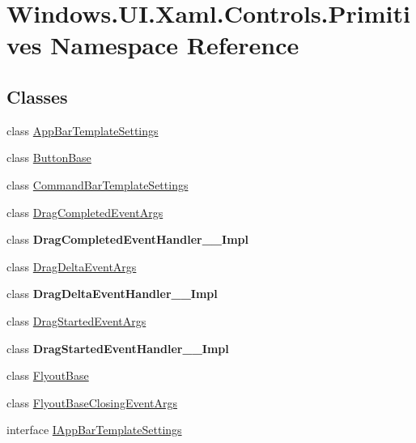 \hypertarget{namespace_windows_1_1_u_i_1_1_xaml_1_1_controls_1_1_primitives}{}\section{Windows.\+U\+I.\+Xaml.\+Controls.\+Primitives Namespace Reference}
\label{namespace_windows_1_1_u_i_1_1_xaml_1_1_controls_1_1_primitives}
\subsection*{Classes}
\begin{DoxyCompactItemize}
\item 
class \hyperlink{class_windows_1_1_u_i_1_1_xaml_1_1_controls_1_1_primitives_1_1_app_bar_template_settings}{App\+Bar\+Template\+Settings}
\item 
class \hyperlink{class_windows_1_1_u_i_1_1_xaml_1_1_controls_1_1_primitives_1_1_button_base}{Button\+Base}
\item 
class \hyperlink{class_windows_1_1_u_i_1_1_xaml_1_1_controls_1_1_primitives_1_1_command_bar_template_settings}{Command\+Bar\+Template\+Settings}
\item 
class \hyperlink{class_windows_1_1_u_i_1_1_xaml_1_1_controls_1_1_primitives_1_1_drag_completed_event_args}{Drag\+Completed\+Event\+Args}
\item 
class {\bfseries Drag\+Completed\+Event\+Handler\+\_\+\+\_\+\+Impl}
\item 
class \hyperlink{class_windows_1_1_u_i_1_1_xaml_1_1_controls_1_1_primitives_1_1_drag_delta_event_args}{Drag\+Delta\+Event\+Args}
\item 
class {\bfseries Drag\+Delta\+Event\+Handler\+\_\+\+\_\+\+Impl}
\item 
class \hyperlink{class_windows_1_1_u_i_1_1_xaml_1_1_controls_1_1_primitives_1_1_drag_started_event_args}{Drag\+Started\+Event\+Args}
\item 
class {\bfseries Drag\+Started\+Event\+Handler\+\_\+\+\_\+\+Impl}
\item 
class \hyperlink{class_windows_1_1_u_i_1_1_xaml_1_1_controls_1_1_primitives_1_1_flyout_base}{Flyout\+Base}
\item 
class \hyperlink{class_windows_1_1_u_i_1_1_xaml_1_1_controls_1_1_primitives_1_1_flyout_base_closing_event_args}{Flyout\+Base\+Closing\+Event\+Args}
\item 
interface \hyperlink{interface_windows_1_1_u_i_1_1_xaml_1_1_controls_1_1_primitives_1_1_i_app_bar_template_settings}{I\+App\+Bar\+Template\+Settings}

\end{DoxyCompactItemize}
